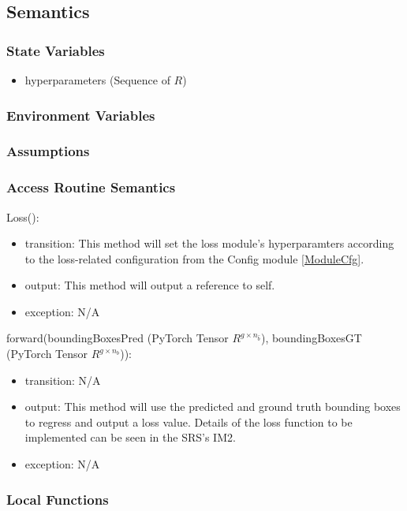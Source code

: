 \documentclass[12pt, titlepage]{article}
\begin{document}
\subsection{Semantics}

\subsubsection{State Variables}

\begin{itemize}
  \item hyperparameters (Sequence of $R$)
\end{itemize}

\subsubsection{Environment Variables}

\subsubsection{Assumptions}

\subsubsection{Access Routine Semantics}
\noindent Loss():
\begin{itemize}
\item transition: This method will set the loss module's hyperparamters according to the loss-related configuration from the Config module \ref{ModuleCfg}. 
\item output: This method will output a reference to self.
\item exception: N/A
\end{itemize}

\noindent forward(boundingBoxesPred (PyTorch Tensor $R^{g\times{}n_{\hat{b}}}$), boundingBoxesGT (PyTorch Tensor $R^{g\times{}n_{b}}$)):
\begin{itemize}
\item transition: N/A 
\item output: This method will use the predicted and ground truth bounding boxes to regress and output a loss value. Details of the loss function to be implemented can be seen in the SRS's IM2.
\item exception: N/A
\end{itemize}

\subsubsection{Local Functions}
\end{document}
